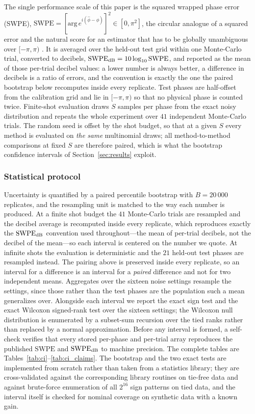 \documentclass[ASNA,twocolumn]{USG}
\newcommand{\phihat}{\hat{\phi}}
\begin{document}
The single performance scale of this paper is the squared wrapped phase error
(SWPE), $\mathrm{SWPE}=[\mathrm{arg}\,e^{i(\phihat-\phi)}]^2\in[0,\pi^2]$, the
circular analogue of a squared error and the natural score for an estimator that
has to be globally unambiguous over $[-\pi,\pi)$ \cite{yang2025vqcnni}.  It is
averaged over the held-out test grid within one Monte-Carlo trial, converted to
decibels, $\mathrm{SWPE}_{\rm dB}=10\log_{10}\mathrm{SWPE}$, and reported as the
mean of those per-trial decibel values: a lower number is always better, a
difference in decibels is a ratio of errors, and the convention is exactly the
one the paired bootstrap below recomputes inside every replicate.  Test phases
are half-offset from the calibration grid and lie in $[-\pi,\pi)$ so that no
physical phase is counted twice.  Finite-shot evaluation draws $S$ samples per
phase from the exact noisy distribution and repeats the whole experiment over
$41$ independent Monte-Carlo trials.  The random seed is offset by the shot
budget, so that at a given $S$ every method is evaluated on \emph{the same}
multinomial draws; all method-to-method comparisons at fixed $S$ are therefore
paired, which is what the bootstrap confidence intervals of
Section~\ref{sec:results} exploit.

\subsubsection{Statistical protocol}
Uncertainty is quantified by a paired percentile bootstrap with $B=20\,000$
replicates, and the resampling unit is matched to the way each number is
produced.  At a finite shot budget the $41$ Monte-Carlo trials are resampled and
the decibel average is recomputed inside every replicate, which reproduces
exactly the $\mathrm{SWPE}_{\rm dB}$ convention used throughout---the mean of
per-trial decibels, not the decibel of the mean---so each interval is centered on
the number we quote.  At infinite shots the evaluation is deterministic and the
$21$ held-out test phases are resampled instead.  The pairing above is preserved
inside every replicate, so an interval for a difference is an interval for a
\emph{paired} difference and not for two independent means.  Aggregates over the
sixteen noise settings resample the settings, since those rather than the test
phases are the population such a mean generalizes over.  Alongside each interval
we report the exact sign test and the exact Wilcoxon signed-rank test over the
sixteen settings; the Wilcoxon null distribution is enumerated by a subset-sum
recursion over the tied ranks rather than replaced by a normal approximation.
Before any interval is formed, a self-check verifies that every stored per-phase
and per-trial array reproduces the published $\mathrm{SWPE}$ and
$\mathrm{SWPE}_{\rm dB}$ to machine precision.  The complete tables are
Tables~\ref{tab:ci}--\ref{tab:ci_claims}.  The bootstrap and the two exact tests
are implemented from scratch rather than taken from a statistics library; they
are cross-validated against the corresponding library routines on tie-free data
and against brute-force enumeration of all $2^{16}$ sign patterns on tied data,
and the interval itself is checked for nominal coverage on synthetic data with a
known gain.
\end{document}
